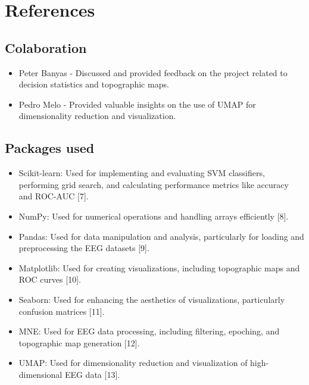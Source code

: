 \documentclass[
  letterpaper,
  DIV=11,
  numbers=noendperiod]{scrartcl}
\providecommand{\tightlist}{%
  \setlength{\itemsep}{0pt}\setlength{\parskip}{0pt}}\usepackage{longtable,booktabs,array}
\begin{document}
\section{References}\label{references}

\subsection{Colaboration}\label{colaboration}

\begin{itemize}
\tightlist
\item
  Peter Banyas - Discussed and provided feedback on the project related
  to decision statistics and topographic maps.
\item
  Pedro Melo - Provided valuable insights on the use of UMAP for
  dimensionality reduction and visualization.
\end{itemize}

\subsection{Packages used}\label{packages-used}

\begin{itemize}
\tightlist
\item
  Scikit-learn: Used for implementing and evaluating SVM classifiers,
  performing grid search, and calculating performance metrics like
  accuracy and ROC-AUC {[}7{]}.
\item
  NumPy: Used for numerical operations and handling arrays efficiently
  {[}8{]}.
\item
  Pandas: Used for data manipulation and analysis, particularly for
  loading and preprocessing the EEG datasets {[}9{]}.
\item
  Matplotlib: Used for creating visualizations, including topographic
  maps and ROC curves {[}10{]}.
\item
  Seaborn: Used for enhancing the aesthetics of visualizations,
  particularly confusion matrices {[}11{]}.
\item
  MNE: Used for EEG data processing, including filtering, epoching, and
  topographic map generation {[}12{]}.
\item
  UMAP: Used for dimensionality reduction and visualization of
  high-dimensional EEG data {[}13{]}.
\end{itemize}
\end{document}
